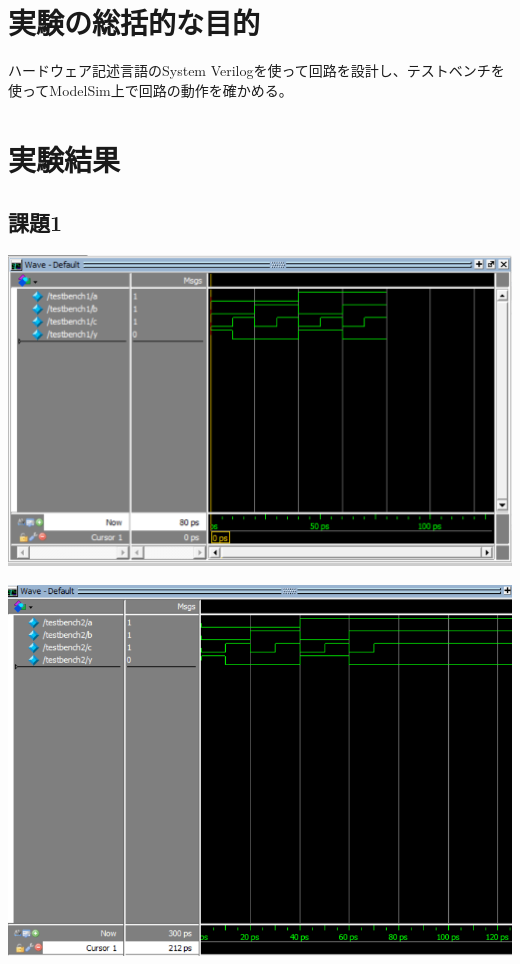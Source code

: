 \documentclass[a4paper]{jarticle}
\begin{document}
\section{実験の総括的な目的}
ハードウェア記述言語のSystem Verilogを使って回路を設計し、テストベンチを使ってModelSim上で回路の動作を確かめる。
\section{実験結果}
\subsection{課題1}
\begin{center}
	\includegraphics[width=15cm]{1-m-1.PNG}
\end{center}
\begin{center}
	\includegraphics[width=15cm]{1-m-2.PNG}
\end{center}
\end{document}
